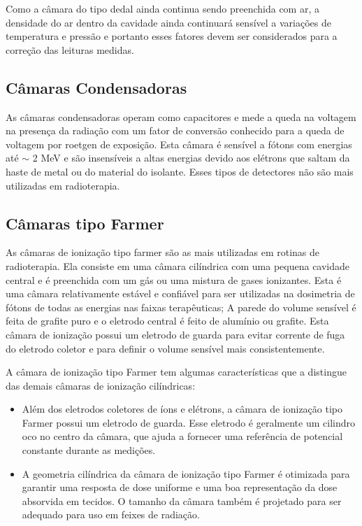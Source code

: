 \documentclass[11pt,a4paper]{article}
\begin{document}
		Como a câmara do tipo dedal ainda continua sendo preenchida com ar, a densidade do ar dentro da cavidade ainda continuará sensível a variações de temperatura e pressão e portanto esses fatores devem ser considerados para a correção das leituras medidas.


	\subsection{Câmaras Condensadoras}

		As câmaras condensadoras operam como capacitores e mede a queda na voltagem na presença da radiação com um fator de conversão conhecido para a queda de voltagem por roetgen de exposição. Esta câmara é sensível a fótons com energias até $\sim$ 2 MeV e são insensíveis a altas energias devido aos elétrons que saltam da haste de metal ou do material do isolante. Esses tipos de detectores não são mais utilizadas em radioterapia. 

	\subsection{Câmaras tipo Farmer}
		
		As câmaras de ionização tipo farmer são as mais utilizadas em rotinas de radioterapia. Ela consiste em uma câmara cilíndrica com uma pequena cavidade central e é preenchida com um gás ou uma mistura de gases ionizantes. Esta é uma câmara relativamente estável e confiável para ser utilizadas na dosimetria de fótons de todas as energias nas faixas terapêuticas; A parede do volume sensível é feita de grafite puro e o eletrodo central é feito de alumínio ou grafite. Esta câmara de ionização possui um eletrodo de guarda para evitar corrente de fuga do eletrodo coletor e para definir o volume sensível mais consistentemente.

		A câmara de ionização tipo Farmer tem algumas características que a distingue das demais câmaras de ionização cilíndricas:

		\begin{itemize}[label=\textcolor{CarnationPink}{$\blacktriangleright$}]
			\item Além dos eletrodos coletores de íons e elétrons, a câmara de ionização tipo Farmer possui um eletrodo de guarda. Esse eletrodo é geralmente um cilindro oco no centro da câmara, que ajuda a fornecer uma referência de potencial constante durante as medições.
			\item A geometria cilíndrica da câmara de ionização tipo Farmer é otimizada para garantir uma resposta de dose uniforme e uma boa representação da dose absorvida em tecidos. O tamanho da câmara também é projetado para ser adequado para uso em feixes de radiação.
		\end{itemize}
\end{document}
